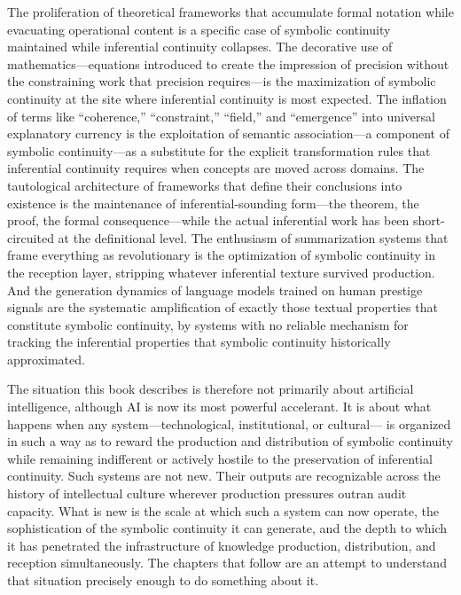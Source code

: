 \documentclass[12pt, openright, twoside]{book}
\begin{document}
The proliferation of theoretical frameworks that accumulate formal notation
while evacuating operational content is a specific case of symbolic continuity
maintained while inferential continuity collapses. The decorative use of
mathematics---equations introduced to create the impression of precision
without the constraining work that precision requires---is the maximization of
symbolic continuity at the site where inferential continuity is most expected.
The inflation of terms like ``coherence,'' ``constraint,'' ``field,'' and
``emergence'' into universal explanatory currency is the exploitation of semantic
association---a component of symbolic continuity---as a substitute for the
explicit transformation rules that inferential continuity requires when concepts
are moved across domains. The tautological architecture of frameworks that define
their conclusions into existence is the maintenance of inferential-sounding
form---the theorem, the proof, the formal consequence---while the actual
inferential work has been short-circuited at the definitional level. The
enthusiasm of summarization systems that frame everything as revolutionary
is the optimization of symbolic continuity in the reception layer, stripping
whatever inferential texture survived production. And the generation dynamics
of language models trained on human prestige signals are the systematic
amplification of exactly those textual properties that constitute symbolic
continuity, by systems with no reliable mechanism for tracking the inferential
properties that symbolic continuity historically approximated.

The situation this book describes is therefore not primarily about artificial
intelligence, although AI is now its most powerful accelerant. It is about
what happens when any system---technological, institutional, or cultural---
is organized in such a way as to reward the production and distribution of
symbolic continuity while remaining indifferent or actively hostile to the
preservation of inferential continuity. Such systems are not new. Their
outputs are recognizable across the history of intellectual culture wherever
production pressures outran audit capacity. What is new is the scale at which
such a system can now operate, the sophistication of the symbolic continuity
it can generate, and the depth to which it has penetrated the infrastructure
of knowledge production, distribution, and reception simultaneously. The
chapters that follow are an attempt to understand that situation precisely
enough to do something about it.
\end{document}
